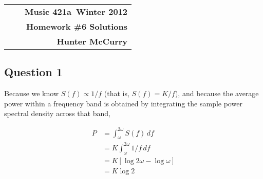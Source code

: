 \documentclass[11pt]{article}
\makeatletter
\newcommand{\course}{Music 421a}
\newcommand{\semester}{Winter 2012}
\newcommand{\hwk}{Homework \#6 Solutions}
\newcommand{\student}{Hunter McCurry}
\renewcommand\maketitle{
\begin{center}
\begin{tabular*}{6.44in}{l @{\extracolsep{\fill}}c r}
\bfseries  &  & \bfseries \course ~\semester \\
\bfseries&  & \bfseries  \hwk  \\
\bfseries   &   &  \bfseries \student \\ 
\end{tabular*}
\end{center} }
\makeatother
\begin{document}
\maketitle
\thispagestyle{plain}

\subsection*{Question 1}
Because we know $S(f) \propto 1/f$ (that is, $S(f) = K/f$), and because the average power within a frequency band is obtained by integrating the sample power spectral density across that band,

\begin{align*}
P &= \! \int_{\omega}^{2\omega} S(f)\,df \\
&= K \! \int_{\omega}^{2\omega} 1/f\,df \\
&= K [ \log{2\omega} - \log{\omega}] \\
&= K \log{2}
\end{align*}
\end{document}
